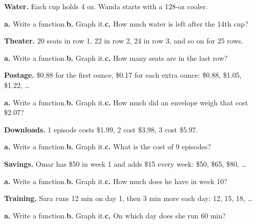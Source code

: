 \documentclass[11pt,a4paper]{article}
\newenvironment{FRQGrid}{%
  \begin{tcbraster}[raster columns=2,raster equal height=rows,raster column skip=4mm,
    raster row skip=3mm]}{\end{tcbraster}}
\begin{document}
\begin{FRQGrid}
\begin{FRQ}[qsource={Textbook · Ex. 23},qlevel=2,lines=3,final={$a_n=128-4n$; 72 oz}]
  \textbf{Water.} Each cup holds 4 oz. Wanda starts with a 128-oz cooler.\par
  \textbf{a.} Write a function.\quad \textbf{b.} Graph it.\quad \textbf{c.} How much water is left after the 14th cup?
\end{FRQ}
\begin{FRQ}[qsource={Textbook · Ex. 24},qlevel=1,lines=3,final={$a_n=2n+18$; 68 seats}]
  \textbf{Theater.} 20 seats in row 1, 22 in row 2, 24 in row 3, and so on for 25 rows.\par
  \textbf{a.} Write a function.\quad \textbf{b.} Graph it.\quad \textbf{c.} How many seats are in the last row?
\end{FRQ}
\begin{FRQ}[qsource={Textbook · Ex. 25},qlevel=3,lines=3,final={$a_n=0.17n+0.71$; 8 oz}]
  \textbf{Postage.} \$0.88 for the first ounce, \$0.17 for each extra ounce: \$0.88, \$1.05, \$1.22, \dots\par
  \textbf{a.} Write a function.\quad \textbf{b.} Graph it.\quad \textbf{c.} How much did an envelope weigh that cost \$2.07?
\end{FRQ}
\begin{FRQ}[qsource={Textbook · Ex. 26},qlevel=1,lines=3,final={$a_n=1.99n$; \$17.91}]
  \textbf{Downloads.} 1 episode costs \$1.99, 2 cost \$3.98, 3 cost \$5.97.\par
  \textbf{a.} Write a function.\quad \textbf{b.} Graph it.\quad \textbf{c.} What is the cost of 9 episodes?
\end{FRQ}
\begin{FRQ}[qlevel=2,lines=3,final={$a_n=15n+35$; \$185}]
  \textbf{Savings.} Omar has \$50 in week 1 and adds \$15 every week: \$50, \$65, \$80, \dots\par
  \textbf{a.} Write a function.\quad \textbf{b.} Graph it.\quad \textbf{c.} How much does he have in week 10?
\end{FRQ}
\begin{FRQ}[qlevel=3,lines=3,final={$a_n=3n+9$; day 17}]
  \textbf{Training.} Sara runs 12 min on day 1, then 3 min more each day: 12, 15, 18, \dots\par
  \textbf{a.} Write a function.\quad \textbf{b.} Graph it.\quad \textbf{c.} On which day does she run 60 min?
\end{FRQ}
\end{FRQGrid}
\end{document}
